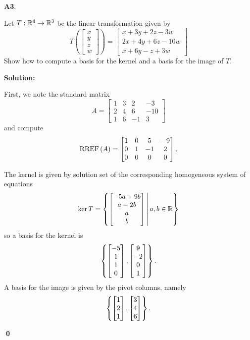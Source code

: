 \documentclass{article}
\newenvironment{problem}[1]
{
  \begin{flushleft}
  \textbf{#1}.
  \ignorespaces
}
{
  \end{flushleft}
}
\newenvironment{solution}
{
  \ignorespaces
  \textbf{Solution:}
}
{
  \ignorespacesafterend
  \begin{flushright}
  {\bfseries \qed}
  \end{flushright}
}
\begin{document}
\begin{problem}{A3}
Let \(T: \mathbb{R}^4 \rightarrow \mathbb{R}^3\) be the linear transformation given by
\[
  T\left(\begin{bmatrix}x\\y\\z\\w\end{bmatrix} \right) =
  \begin{bmatrix}
    x+3y+2z-3w \\
    2x+4y+6z-10w \\
    x+6y-z+3w
  \end{bmatrix}
\]
Show how to compute a basis for the kernel and a basis for the image of \(T\).
\end{problem}
\begin{solution}
First, we note the standard matrix
\[A=\begin{bmatrix}1 & 3 & 2 & -3 \\ 2 & 4 & 6 & -10 \\ 1 & 6 & -1 & 3 \end{bmatrix}\]
and compute
\[\operatorname{RREF}\left(A\right) = \begin{bmatrix} 1 & 0 & 5 & -9 \\ 0 & 1 & -1 & 2 \\ 0 & 0 & 0 & 0\end{bmatrix}.\]

The kernel is given by solution set of the corresponding homogeneous system of equations
\[ \ker T = \left\{\begin{bmatrix}-5a+9b \\ a-2b \\ a \\ b \end{bmatrix}\,\middle|\,a,b \in \mathbb{R}\right\} \]
so a basis for the kernel is
\[\left\{\begin{bmatrix}-5 \\ 1 \\ 1 \\ 0 \end{bmatrix},
\begin{bmatrix}9 \\ -2 \\ 0 \\ 1 \end{bmatrix}\right\}.\]
A basis for the image is given by the pivot columns, namely
\[\left\{\begin{bmatrix}1\\2\\1 \end{bmatrix},
\begin{bmatrix}3\\4\\6 \end{bmatrix}\right\}.\]
\end{solution}
\end{document}
